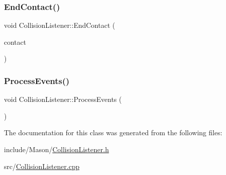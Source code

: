 \hypertarget{class_mason_1_1_collision_listener_a41a2b9775c5814c1446ceffdeb009640}{}\label{class_mason_1_1_collision_listener_a41a2b9775c5814c1446ceffdeb009640} 
\subsubsection{\texorpdfstring{End\+Contact()}{EndContact()}}
{\footnotesize\ttfamily void Collision\+Listener\+::\+End\+Contact (\begin{DoxyParamCaption}\item[{b2\+Contact $\ast$}]{contact }\end{DoxyParamCaption})\hspace{0.3cm}{\ttfamily [override]}}

\hypertarget{class_mason_1_1_collision_listener_a10c4d83465cd2a9f6dd9d6e4dfba2834}{}\label{class_mason_1_1_collision_listener_a10c4d83465cd2a9f6dd9d6e4dfba2834} 
\subsubsection{\texorpdfstring{Process\+Events()}{ProcessEvents()}}
{\footnotesize\ttfamily void Collision\+Listener\+::\+Process\+Events (\begin{DoxyParamCaption}{ }\end{DoxyParamCaption})}



The documentation for this class was generated from the following files\+:\begin{DoxyCompactItemize}
\item 
include/\+Mason/\hyperlink{_collision_listener_8h}{Collision\+Listener.\+h}\item 
src/\hyperlink{_collision_listener_8cpp}{Collision\+Listener.\+cpp}\end{DoxyCompactItemize}
